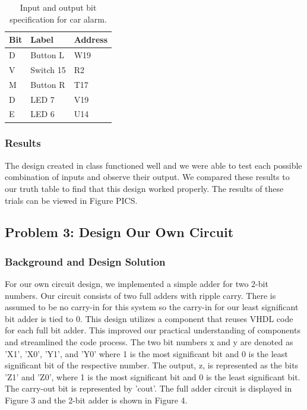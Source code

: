 \documentclass[11pt]{article}
\begin{document}
\begin{table}[h]
\begin{center}
	\begin{tabular}{| l | l | l |}
		\hline
		Bit & Label & Address \\ \hline
		D & Button L & W19 \\ \hline
		V & Switch 15 & R2 \\ \hline
		M & Button R & T17 \\ \hline
		D & LED 7 & V19 \\ \hline
		E & LED 6 & U14 \\ \hline
	\end{tabular}
	\caption{\label{tab:table-name}Input and output bit specification for car alarm.}
\end{center}	
\end{table}

\subsubsection{Results}

The design created in class functioned well and we were able to test each possible combination of inputs and observe their output. We compared these results to our truth table to find that this design worked properly. The results of these trials can be viewed in Figure PICS.

\subsection{Problem 3: Design Our Own Circuit}

\subsubsection{Background and Design Solution}

For our own circuit design, we implemented a simple adder for two 2-bit numbers. Our circuit consists of two full adders with ripple carry. There is assumed to be no carry-in for this system so the carry-in for our least significant bit adder is tied to 0. This design utilizes a component that reuses VHDL code for each full bit adder. This improved our practical understanding of components and streamlined the code process. The two bit numbers x and y are denoted as 'X1', 'X0', 'Y1', and 'Y0' where 1 is the most significant bit and 0 is the least significant bit of the respective number. The output, z, is represented as the bits 'Z1' and 'Z0', where 1 is the most significant bit and 0 is the least significant bit. The carry-out bit is represented by 'cout'. The full adder circuit is displayed in Figure 3 and the 2-bit adder is shown in Figure 4.
\end{document}
